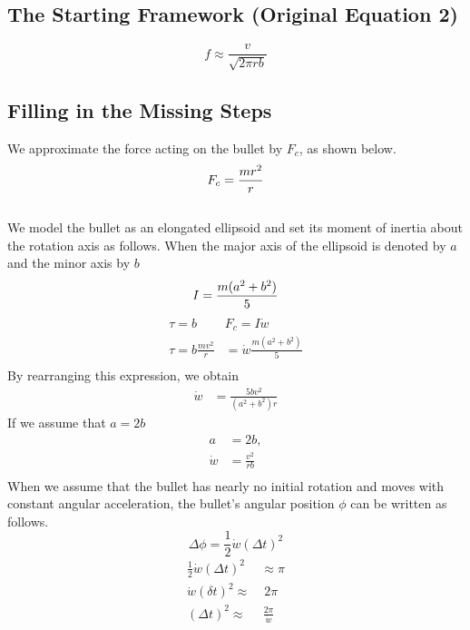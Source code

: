 \documentclass[11pt,letterpaper]{article}
\begin{document}
\subsection{The Starting Framework (Original Equation 2)}
\begin{equation}
f \approx \frac{v}{\sqrt{2\pi rb}}
\end{equation}
\subsection{Filling in the Missing Steps}
We approximate the force acting on the bullet by $F_c$, as shown below.\\
\begin{equation}
F_c = \frac{mr^2}{r}\\
\end{equation}
\\
We model the bullet as an elongated ellipsoid and set its moment of inertia about the rotation axis as follows. When the major axis of the ellipsoid is denoted by $a$ and the minor axis by $b$\\
\begin{equation}
\\
I = \frac{m(a^2+b^2)}{5}\\
\end{equation}
\begin{align*}
\tau = b&F_c = I\dot{w}\\[0.5em]
\tau = b\frac{mv^2}{r} &= \dot{w}\frac{m(a^2+b^2)}{5}\\
\end{align*}
By rearranging this expression, we obtain
\begin{align*}
\dot{w}&=\frac{5bv^2}{(a^2+b^2)r}
\end{align*}
If we assume that $a=2b$
\begin{align*}
a &= 2b,\\[0.5em]
\dot{w}&=\frac{v^2}{rb}\\
\end{align*}
When we assume that the bullet has nearly no initial rotation and moves with constant angular acceleration, the bullet's angular position $\phi$ can be written as follows.
\begin{equation}
\Delta \phi = \frac{1}{2}\dot{w}(\Delta t)^2
\end{equation}
\begin{align*}
\frac{1}{2}\dot{w}(\Delta t)^2 &\approx \pi\\[1em]
\dot{w}(\delta t)^2 \approx & \;2\pi\\[0.5em]
(\Delta t)^2 \approx&\,\frac{2\pi}{\dot{w}}
\end{align*}
\end{document}
